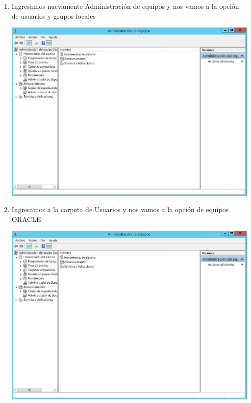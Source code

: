 \begin{enumerate}[1.]
	\item Ingresamos nuevamente Administraci\'on de equipos y nos vamos a la opci\'on de usuarios y grupos locales\\
	\begin{center}
	\includegraphics[width=15cm]{./Imagenes/img5} 
	\end{center}

	\item Ingresamos a la carpeta de Usuarios y nos vamos a la opci\'on de equipos ORACLE\\
	\begin{center}
	\includegraphics[width=15cm]{./Imagenes/img6} 
	\end{center}


\end{enumerate}

